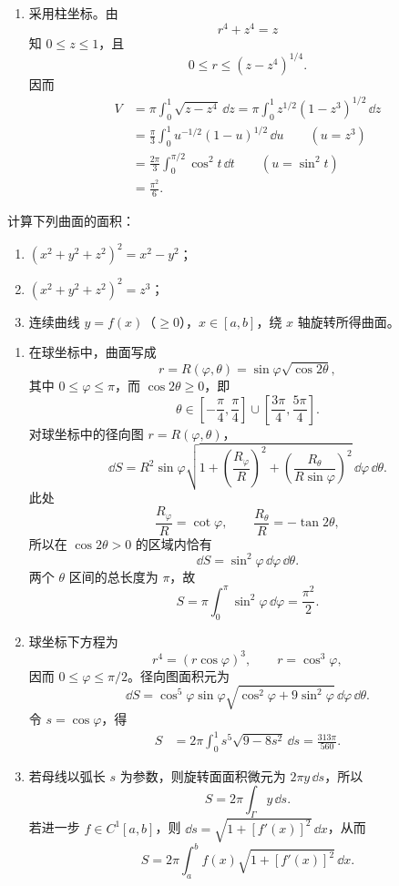 \begin{xsolution}
\begin{enumerate}[label=(\arabic*)]
  \item 采用柱坐标。由
  \[
   r^4+z^4=z
  \]
  知 $0\le z\le1$，且
  \[
   0\le r\le(z-z^4)^{1/4}.
  \]
  因而
  \begin{align*}
   V&=\pi\int_0^1\sqrt{z-z^4}\,\dd z
   =\pi\int_0^1z^{1/2}(1-z^3)^{1/2}\,\dd z\\
   &=\frac\pi3\int_0^1u^{-1/2}(1-u)^{1/2}\,\dd u
   \qquad(u=z^3)\\
   &=\frac{2\pi}{3}\int_0^{\pi/2}\cos^2 t\,\dd t
   \qquad(u=\sin^2t)\\
   &=\boxed{\frac{\pi^2}{6}}.
  \end{align*}
\end{enumerate}
\end{xsolution}


\begin{xexercise}[2]
计算下列曲面的面积：
  \begin{enumerate}[label=(\arabic*)]
    \item $(x^2+y^2+z^2)^2=x^2-y^2$；
    \item $(x^2+y^2+z^2)^2=z^3$；
    \item 连续曲线 $y=f(x)$（$\ge0$），$x\in[a,b]$，绕 $x$ 轴旋转所得曲面。
  \end{enumerate}
\end{xexercise}
\begin{xsolution}
\begin{enumerate}[label=(\arabic*)]
  \item 在球坐标中，曲面写成
  \[
   r=R(\varphi,\theta)=\sin\varphi\sqrt{\cos2\theta},
  \]
  其中 $0\le\varphi\le\pi$，而 $\cos2\theta\ge0$，即
  \[
   \theta\in\left[-\frac\pi4,\frac\pi4\right]
   \cup\left[\frac{3\pi}{4},\frac{5\pi}{4}\right].
  \]
  对球坐标中的径向图 $r=R(\varphi,\theta)$，
  \[
   \dd S=R^2\sin\varphi
   \sqrt{1+\left(\frac{R_\varphi}{R}\right)^2+
   \left(\frac{R_\theta}{R\sin\varphi}\right)^2}
   \,\dd\varphi\,\dd\theta.
  \]
  此处
  \[
   \frac{R_\varphi}{R}=\cot\varphi,
   \qquad
   \frac{R_\theta}{R}=-\tan2\theta,
  \]
  所以在 $\cos2\theta>0$ 的区域内恰有
  \[
   \dd S=\sin^2\varphi\,\dd\varphi\,\dd\theta.
  \]
  两个 $\theta$ 区间的总长度为 $\pi$，故
  \[
   \boxed{S=\pi\int_0^\pi\sin^2\varphi\,\dd\varphi=\frac{\pi^2}{2}}.
  \]

  \item 球坐标下方程为
  \[
   r^4=(r\cos\varphi)^3,
   \qquad r=\cos^3\varphi,
  \]
  因而 $0\le\varphi\le\pi/2$。径向图面积元为
  \[
   \dd S=\cos^5\varphi\sin\varphi
   \sqrt{\cos^2\varphi+9\sin^2\varphi}
   \,\dd\varphi\,\dd\theta.
  \]
  令 $s=\cos\varphi$，得
  \begin{align*}
   S&=2\pi\int_0^1s^5\sqrt{9-8s^2}\,\dd s
   =\boxed{\frac{313\pi}{560}}.
  \end{align*}

  \item 若母线以弧长 $s$ 为参数，则旋转面面积微元为 $2\pi y\,\dd s$，所以
  \[
   \boxed{S=2\pi\int_\Gamma y\,\dd s}.
  \]
  若进一步 $f\in C^1[a,b]$，则 $\dd s=\sqrt{1+[f'(x)]^2}\,\dd x$，从而
  \[
   \boxed{S=2\pi\int_a^bf(x)\sqrt{1+[f'(x)]^2}\,\dd x}.
  \]
\end{enumerate}
\end{xsolution}


